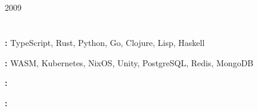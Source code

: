\documentclass[11pt,a4paper]{article}
\newcommand{\header}[2]
	{\textbf{#1}\hfill\small{#2}\normalsize\par\vspace{-0.4em}}
\newcommand{\subheader}[2]
	{\small\textit{#1}\hfill\textit{#2}\normalsize\vspace{-0.4em}}
\newcommand{\simplelist}[2]
	{\small\textbf{#1:} {#2}\normalsize\par\vspace{-0.4em}}
\begin{document}
	\section{\strSectionEducation}

	\header{\strHeaderUniversity}{2009}
	\subheader{\strEducationDegree}{\strLocNovosibirsk}

	\section{\strSectionSkillsInterests}
	\simplelist{\strLabelProgrammingLanguages}{TypeScript, Rust, Python, Go, Clojure, Lisp, Haskell}
	\simplelist{\strLabelTech}{WASM, Kubernetes, NixOS, Unity, PostgreSQL, Redis, MongoDB}
	\simplelist{\strLabelSpokenLanguages}{\strSpokenLanguagesList}
	\simplelist{\strLabelInterests}{\strInterestsList}
\end{document}
